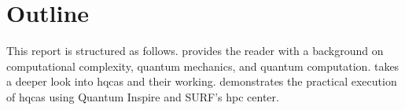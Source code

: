 \section{Outline}
This report is structured as follows.
 provides the reader with a background on computational complexity, quantum mechanics, and quantum computation.
 takes a deeper look into \glspl{hqca} and their working.
 demonstrates the practical execution of \glspl{hqca} using Quantum Inspire and SURF's \gls{hpc} center.
